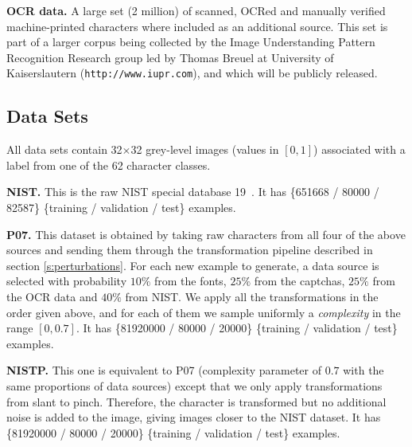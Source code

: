 \documentclass{article} %
\begin{document}
{\bf OCR data.}
A large set (2 million) of scanned, OCRed and manually verified machine-printed 
characters where included as an
additional source. This set is part of a larger corpus being collected by the Image Understanding
Pattern Recognition Research group led by Thomas Breuel at University of Kaiserslautern 
({\tt http://www.iupr.com}), and which will be publicly released.

\subsection{Data Sets}

All data sets contain 32$\times$32 grey-level images (values in $[0,1]$) associated with a label
from one of the 62 character classes.

{\bf NIST.} This is the raw NIST special database 19~\citep{Grother-1995}. It has
\{651668 / 80000 / 82587\} \{training / validation / test\} examples.

{\bf P07.} This dataset is obtained by taking raw characters from all four of the above sources
and sending them through the transformation pipeline described in section \ref{s:perturbations}.
For each new example to generate, a data source is selected with probability $10\%$ from the fonts,
$25\%$ from the captchas, $25\%$ from the OCR data and $40\%$ from NIST. We apply all the transformations in the
order given above, and for each of them we sample uniformly a \emph{complexity} in the range $[0,0.7]$.
It has \{81920000 / 80000 / 20000\} \{training / validation / test\} examples.

{\bf NISTP.} This one is equivalent to P07 (complexity parameter of $0.7$ with the same proportions of data sources)
  except that we only apply
  transformations from slant to pinch. Therefore, the character is
  transformed but no additional noise is added to the image, giving images
  closer to the NIST dataset. 
It has \{81920000 / 80000 / 20000\} \{training / validation / test\} examples.
\end{document}
